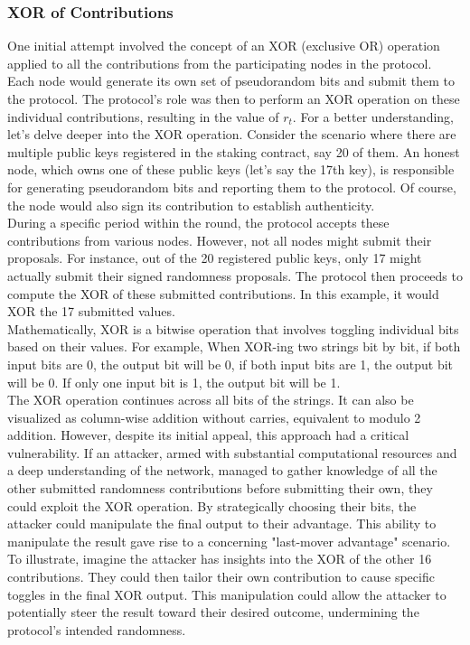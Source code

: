 \subsubsection{XOR of Contributions}
One initial attempt involved the concept of an XOR (exclusive OR) operation applied to all the contributions from the participating nodes in the protocol. Each node would generate its own set of pseudorandom bits and submit them to the protocol. The protocol's role was then to perform an XOR operation on these individual contributions, resulting in the value of $r_t$.
For a better understanding, let's delve deeper into the XOR operation. Consider the scenario where there are multiple public keys registered in the staking contract, say 20 of them. An honest node, which owns one of these public keys (let's say the 17th key), is responsible for generating pseudorandom bits and reporting them to the protocol. Of course, the node would also sign its contribution to establish authenticity.\\
During a specific period within the round, the protocol accepts these contributions from various nodes. However, not all nodes might submit their proposals. For instance, out of the 20 registered public keys, only 17 might actually submit their signed randomness proposals. The protocol then proceeds to compute the XOR of these submitted contributions. In this example, it would XOR the 17 submitted values.\\
Mathematically, XOR is a bitwise operation that involves toggling individual bits based on their values. For example, When XOR-ing two strings bit by bit, if both input bits are 0, the output bit will be 0, if both input bits are 1, the output bit will be 0. If only one input bit is 1, the output bit will be 1.\\
The XOR operation continues across all bits of the strings. It can also be visualized as column-wise addition without carries, equivalent to modulo 2 addition. However, despite its initial appeal, this approach had a critical vulnerability. If an attacker, armed with substantial computational resources and a deep understanding of the network, managed to gather knowledge of all the other submitted randomness contributions before submitting their own, they could exploit the XOR operation. By strategically choosing their bits, the attacker could manipulate the final output to their advantage. This ability to manipulate the result gave rise to a concerning "last-mover advantage" scenario.\\
To illustrate, imagine the attacker has insights into the XOR of the other 16 contributions. They could then tailor their own contribution to cause specific toggles in the final XOR output. This manipulation could allow the attacker to potentially steer the result toward their desired outcome, undermining the protocol's intended randomness.\\
